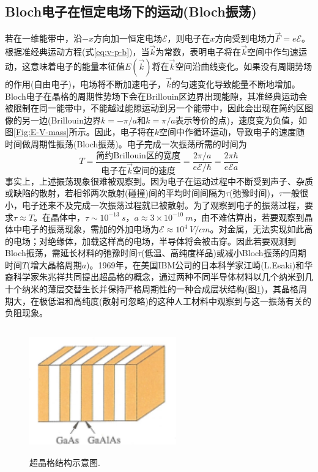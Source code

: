 \subsection{Bloch电子在恒定电场下的运动(Bloch振荡)} 
若在一维能带中，沿$-x$方向加一恒定电场$\mathscr{E}$，则电子在$x$方向受到电场力$\vec F=e\mathscr{E}$。根据准经典运动方程(式\eqref{eq:v-p-b})，当$\vec k$为常数，表明电子将在$\vec k$空间中作匀速运动，这意味着电子的能量本征值$E(\vec k)$将在$\vec k$空间沿曲线变化。如果没有周期势场的作用(自由电子)，电场将不断加速电子，$\vec k$的匀速变化导致能量不断地增加。Bloch电子在晶格的周期性势场下会在Brillouin区边界出现能隙，其准经典运动会被限制在同一能带中，不能越过能隙运动到另一个能带中，因此会出现在简约区图像的另一边(Brillouin边界$k=-\pi/a$和$k=\pi/a$表示等价的点)，速度变为负值，如图\ref{Fig:E-V-mass}所示。因此，电子将在$k$空间中作循环运动，导致电子的速度随时间做周期性振荡(Bloch振荡)。电子完成一次振荡所需的时间为
\begin{equation}
	T=\dfrac{\mbox{简约Brillouin区的宽度}}{\mbox{电子在$\vec k$空间的速度}}=\dfrac{2\pi/a}{e\mathscr{E}/\hbar}=\dfrac{2\pi\hbar}{e\mathscr{E}a}
	\label{eq:T_vibration}
\end{equation}
事实上，上述振荡现象很难被观察到。因为电子在运动过程中不断受到声子、杂质或缺陷的散射，若相邻两次散射(碰撞)间的平均时间间隔为$\tau$(弛豫时间)，$\tau$一般很小，电子还来不及完成一次振荡过程就已被散射。为了观察到电子的振荡过程，要求$\tau\approx T$。在晶体中，$\tau\sim10^{-13}~s$，$a\approx3\times10^{-10}~m$，由不难估算出，若要观察到晶体中电子的振荡现象，需加的外加电场为$\mathscr{E}\approx10^4~{V/cm}$。对金属，无法实现如此高的电场；对绝缘体，加载这样高的电场，半导体将会被击穿。因此若要观测到Bloch振荡，需延长材料的弛豫时间$\tau$(低温、高纯度样品)或减小Bloch振荡的周期时间$T$(增大晶格周期$a$)。1969年，在美国IBM公司的日本科学家江崎(L.Esaki)和华裔科学家朱兆祥共同提出超晶格的概念，通过两种不同半导体材料以几个纳米到几十个纳米的薄层交替生长并保持严格周期性的一种合成层状结构(图\ref{Fig:Super_cell})，其晶格周期大，在极低温和高纯度(散射可忽略)的这种人工材料中观察到与这一振荡有关的负阻现象。
\begin{figure}[h!]
\centering
\vspace*{-0.10in}
\includegraphics[height=2.15in,width=2.50in,viewport=0 0 35 27,clip]{Figures/Super_Cell.png}
\caption{\small \textrm{超晶格结构示意图.}}%
\label{Fig:Super_cell}
\end{figure}

